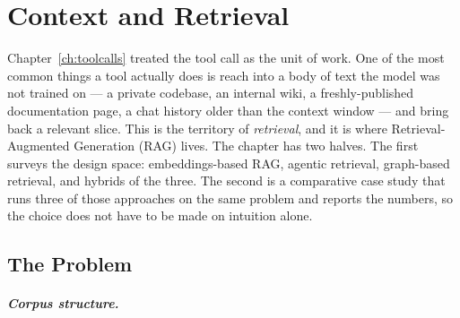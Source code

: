 %

\chapter{Context and Retrieval}
\label{ch:context}


Chapter~\ref{ch:toolcalls} treated the tool call as the unit of
work. One of the most common things a tool actually does is reach
into a body of text the model was not trained on --- a private
codebase, an internal wiki, a freshly-published documentation
page, a chat history older than the context window --- and bring
back a relevant slice. This is the territory of \emph{retrieval},
and it is where Retrieval-Augmented Generation (RAG) lives. The
chapter has two halves. The first surveys the design space:
embeddings-based RAG, agentic retrieval, graph-based retrieval,
and hybrids of the three. The second is a comparative case study
that runs three of those approaches on the same problem and
reports the numbers, so the choice does not have to be made on
intuition alone.

\section{The Problem}
\label{sec:context-problem}


\paragraph{Corpus structure.}

